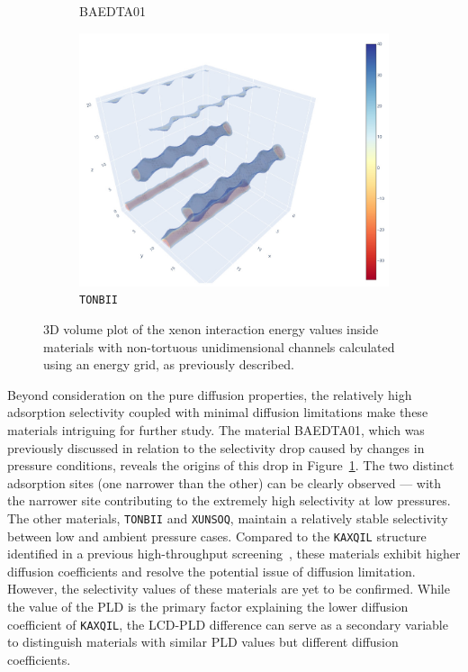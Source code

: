 \documentclass[main]{subfiles}
\begin{document}
\begin{figure}[ht]
\begin{subfigure}[b]{0.32\textwidth}
      \caption{BAEDTA01~\cite{Chen_2010}}\label{fgr:tube_cavities_b}
  \end{subfigure}
  \hfill
  \begin{subfigure}[b]{0.32\textwidth}
      \centering
      \includegraphics[width=\textwidth]{figures/5-diffusion/viz/TONBII.jpg}
      \caption{\texttt{TONBII}~\cite{Du_2010}}\label{fgr:tube_cavities_c}
  \end{subfigure}
     \caption{ 3D volume plot of the xenon interaction energy values inside materials with non-tortuous unidimensional channels calculated using an energy grid, as previously described.}\label{fgr:tube_cavities}
\end{figure}

Beyond consideration on the pure diffusion properties, the relatively high adsorption selectivity coupled with minimal diffusion limitations make these materials intriguing for further study. The material BAEDTA01, which was previously discussed in relation to the selectivity drop caused by changes in pressure conditions, reveals the origins of this drop in Figure~\ref{fgr:tube_cavities_b}. The two distinct adsorption sites (one narrower than the other) can be clearly observed --- with the narrower site contributing to the extremely high selectivity at low pressures. The other materials, \texttt{TONBII} and \texttt{XUNSOQ}, maintain a relatively stable selectivity between low and ambient pressure cases. Compared to the \texttt{KAXQIL} structure identified in a previous high-throughput screening~\autocite{Simon_2015}, these materials exhibit higher diffusion coefficients and resolve the potential issue of diffusion limitation. However, the selectivity values of these materials are yet to be confirmed. While the value of the PLD is the primary factor explaining the lower diffusion coefficient of \texttt{KAXQIL}, the LCD-PLD difference can serve as a secondary variable to distinguish materials with similar PLD values but different diffusion coefficients.
\end{document}
